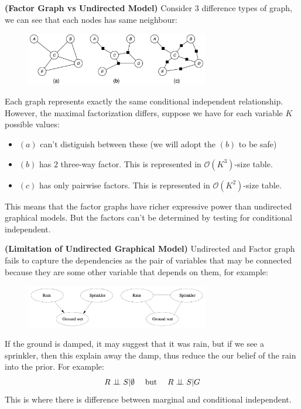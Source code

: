 \begin{remark}{\textbf{(Factor Graph vs Undirected Model)}}
    Consider $3$ difference types of graph, we can see that each nodes has same neighbour: 
    \begin{figure}[H]
        \centering
        \includegraphics[width=8cm]{img/img1.png}
    \end{figure}  
    Each graph represents exactly the same conditional independent relationship. However, the maximal factorization differs, suppose we have for each variable $K$ possible values:
    \begin{itemize}
        \item $(a)$ can't distiguish between these (we will adopt the $(b)$ to be safe)
        \item $(b)$ has $2$ three-way factor. This is represented in $\mathcal{O}(K^3)$-size table. 
        \item $(c)$ has only pairwise factors. This is represented in $\mathcal{O}(K^2)$-size table. 
    \end{itemize}
    This means that the factor graphs have richer expressive power than undirected graphical models. But the factors can't be determined by testing for conditional independent.
\end{remark}

\begin{remark}{\textbf{(Limitation of Undirected Graphical Model)}}
    Undirected and Factor graph fails to capture the dependencies as the pair of variables that may be connected because they are some other variable that depends on them, for example:
    \begin{figure}[H]
        \centering
        \includegraphics[width=8cm]{img/img2.png}
    \end{figure}  
    If the ground is damped, it may suggest that it was rain, but if we see a sprinkler, then this explain away the damp, thus reduce the our belief of the rain into the prior. For example:
    \begin{equation*}
        R \perp \!\!\! \perp S | \emptyset \quad \text{ but } \quad R\perp \!\!\! \perp S | G
    \end{equation*}
    This is where there is difference between marginal and conditional independent. 
\end{remark}

